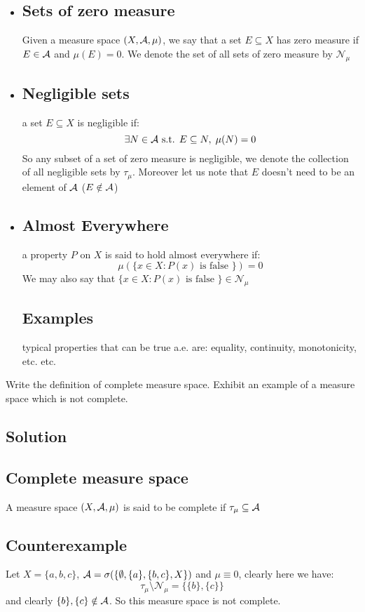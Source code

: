 \provdefs
\begin{itemize}
    \item \subsection{Sets of zero measure} 
    Given a measure space $(X,\mathcal{A},\mu)$, we say that a set $E\subseteq X$ has zero measure if $E\in\mathcal{A}$ and $\mu(E)=0$. We denote the set of all sets of zero measure by $\mathcal{N}_{\mu}$
    \item \subsection{Negligible sets} a set $E\subseteq X$ is negligible if:
    \[
        \exists N\in\mathcal{A} \text{ s.t. } E \subseteq N, \; \mu(N)=0
    \]
    So any subset of a set of zero measure is negligible, we denote the collection of all negligible sets by $\tau_{\mu}$. Moreover let us note that $E$ doesn't need to be an element of $\mathcal{A}$ ($E\notin\mathcal{A}$)
    \item \subsection{Almost Everywhere} a property $P$ on $X$ is said to hold almost everywhere if:
    \[
       \mu( \{ x\in X: P(x) \text{ is false } \} ) = 0    
    \]
    We may also say that $\{ x\in X: P(x) \text{ is false } \} \in \mathcal{N}_{\mu}$\\
    \subsection*{Examples} typical properties that can be true a.e. are: equality, continuity, monotonicity, etc. etc.
\end{itemize}


\question
Write the definition of complete measure space. Exhibit an example of a measure space which is not complete.

\subsection*{Solution}
\subsection{Complete measure space}
A measure space $(X,\mathcal{A},\mu)$ is said to be complete if $\tau_{\mu}\subseteq\mathcal{A}$
\subsection*{Counterexample}
Let $X=\{a,b,c\}$, $\mathcal{A} = \sigma (\{\emptyset, \{a\}, \{b,c\}, X \})$ and $\mu\equiv 0$, clearly here we have:
\[
    \tau_{\mu} \setminus \mathcal{N}_{\mu}= \{ \{b\}, \{c\} \}    
\]
and clearly $\{b\}, \{c\} \notin \mathcal{A}$. So this measure space is not complete.


